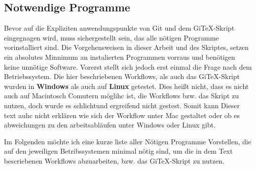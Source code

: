 \documentclass[12pt,a4paper]{scrartcl}
\begin{document}
\subsection{Notwendige Programme}
Bevor auf die Expliziten anwendungspunkte von Git und dem GiTeX-Skript eingegnagen wird, muss sichergestellt sein, das alle nötigen Programme vorinstalliert sind. Die Vorgehensweisen in dieser Arbeit und des Skriptes, setzen ein absolutes Minnimum an instalierten Programmen vorraus und benötigen keine unnötige Software. Vorerst stellt sich jedoch erst einmal die Frage nach dem Betriebssystem. Die hier beschriebenen Workflows, als auch das GiTeX-Skript wurden in \textbf{Windows} als auch auf \textbf{Linux} getestet. Dies heißt nicht, dass es nicht auch auf Macintosch Comutern möglihc ist, die Workflows bzw. das Skript zu nutzen, doch wurde es schlichtund ergreifend nicht gestest. Somit kann Dieser text auhc nicht erklären wie sich der Workflow unter Mac gestaltet oder ob es abweichungen zu den arbeitsabläufen unter Windows oder Linux gibt.

Im Folgenden möchte ich eine kurze liste aller Nötigen Programme Vorstellen, die auf den jeweiligen Betribssystemen minimal nötig sind, um die in dem Text bescriebenen Workflows abzuarbeiten, bzw. das GiTeX-Skript zu nutzen.
\end{document}
